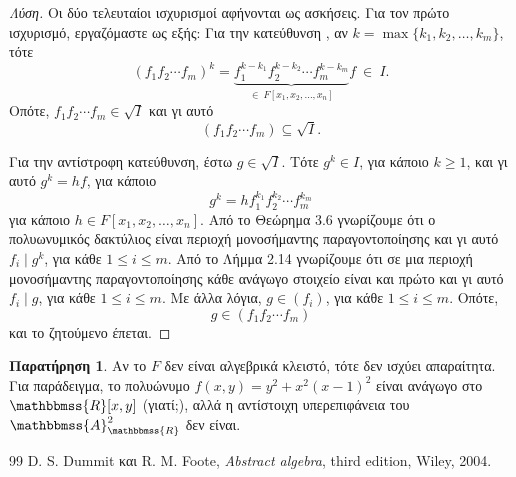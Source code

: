 \documentclass[12pt,a4paper,reqno]{amsart}
\theoremstyle{definition}
\newtheorem*{remark}{Παρατήρηση}
\renewcommand{\AA}{\mathbbmss{A}}
\newcommand{\RR}{\mathbbmss{R}}
\begin{document}
\begin{proof}[Λύση]
  Οι δύο τελευταίοι ισχυρισμοί αφήνονται ως ασκήσεις. Για τον πρώτο ισχυρισμό, εργαζόμαστε ως εξής:
  Για την κατεύθυνση \textquote{$\supseteq$}, αν $k = \max\{k_1, k_2, \dots, k_m\}$, τότε 
  \[
  \left(
    f_1f_2\cdots f_m
  \right)^k = \underbrace{f_1^{k-k_1}f_2^{k-k_2}\cdots f_m^{k-k_m}}_{\in \ F[x_1, x_2, \dots, x_n]} f \ \in \ I.
  \]
  Οπότε, $f_1f_2\cdots f_m \in \sqrt{I}$ και γι αυτό 
  \[
  \left(
    f_1f_2\cdots{f_m}
  \right) \subseteq \sqrt{I}.
  \]

  Για την αντίστροφη κατεύθυνση, έστω $g \in \sqrt{I}$. Τότε $g^k \in I$, για κάποιο $k \ge 1$, και γι αυτό $g^k = hf$, για κάποιο 
  \[
  g^k = h f_1^{k_1}f_2^{k_2}\cdots f_m^{k_m}
  \]
  για κάποιο $h \in F[x_1, x_2, \dots, x_n]$. Από το Θεώρημα 3.6 γνωρίζουμε ότι ο πολυωνυμικός δακτύλιος είναι περιοχή μονοσήμαντης παραγοντοποίησης και γι αυτό $f_i \mid g^k$, για κάθε $1 \le i \le m$. Από το Λήμμα 2.14 γνωρίζουμε ότι σε μια περιοχή μονοσήμαντης παραγοντοποίησης κάθε ανάγωγο στοιχείο είναι και πρώτο και γι αυτό $f_i \mid g$, για κάθε $1 \le i \le m$. Με άλλα λόγια, $g \in (f_i)$, για κάθε $1 \le i \le m$. Οπότε, 
  \[
  g \in \left(
    f_1f_2\cdots{f_m}
  \right)
  \]
  και το ζητούμενο έπεται.
\end{proof}

\begin{remark}
  Αν το $F$ δεν είναι αλγεβρικά κλειστό, τότε δεν ισχύει απαραίτητα. Για παράδειγμα, το πολυώνυμο $f(x,y) = y^2 + x^2(x-1)^2$ είναι ανάγωγο στο $\RR[x,y]$ (γιατί;), αλλά η αντίστοιχη υπερεπιφάνεια του $\AA_\RR^2$ δεν είναι.
\end{remark}

\begin{thebibliography}{99}
    D. S. Dummit και R. M. Foote, 
    \textit{Abstract algebra},
    third edition, Wiley, 2004. 
\end{thebibliography}
\end{document}
